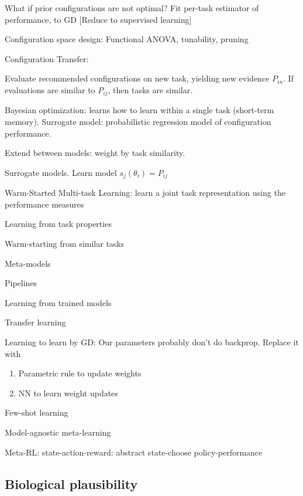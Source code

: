 \documentclass[english]{article}
\begin{document}
\item What if prior configurations are not optimal? Fit per-task estimator of performance, to GD [Reduce to supervised learning]

\item Configuration space design: Functional ANOVA, tunability, pruning

\item Configuration Transfer: 

Evaluate recommended configurations on new task, yielding new evidence $P_{in}$. If evaluations are similar to $P_{ij}$, then tasks are similar.

\item Bayesian optimization: learns how to learn within a single task (short-term memory). Surrogate model: probabilistic regression model of configuration performance. 

Extend between models: weight by task similarity. 

\item Surrogate models. Learn model $s_j(\theta_i)=P_{ij}$

\item Warm-Started Multi-task Learning: learn a joint task representation using the performance measures


\eenum

\item Learning from task properties

Warm-starting from similar tasks

Meta-models

Pipelines

\item Learning from trained models 

Transfer learning

Learning to learn by GD: Our parameters probably don't do backprop. Replace it with 
\begin{enumerate}
\item Parametric rule to update weights
\item NN to learn weight updates
\end{enumerate}

Few-shot learning

Model-agnostic meta-learning

Meta-RL: state-action-reward: abstract state-choose policy-performance

\eenum 
\eenum 



\subsection{Biological plausibility}
\end{document}
